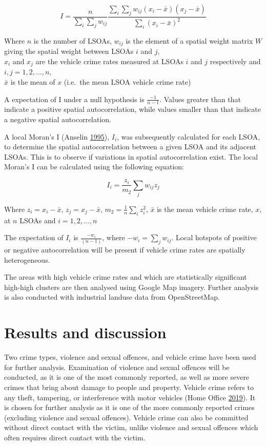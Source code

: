 \documentclass[]{article}
\begin{document}
\[I=\frac{n} {\sum_{i}\sum_{j}w_{ij}} \frac{\sum_{i}\sum_{j}w_{ij}(x_i-\bar{x})(x_j-\bar{x})} {\sum_{i}(x_i-\bar{x})^2}\]

Where \(n\) is the number of LSOAs, \(w_{ij}\) is the element of a
spatial weight matrix \(W\) giving the spatial weight between LSOAs
\(i\) and \(j\),\\
\(x_i\) and \(x_j\) are the vehicle crime rates measured at LSOAs \(i\)
and \(j\) respectively and \(i,j=1,2,...,n\),\\
\(\bar{x}\) is the mean of \(x\) (i.e.~the mean LSOA vehicle crime rate)

A expectation of I under a null hypothesis is \(\frac{-1} {n-1}\).
Values greater than that indicate a positive spatial autocorrelation,
while values smaller than that indicate a negative spatial
autocorrelation.

A local Moran's I (Anselin \protect\hyperlink{ref-Anselin1995}{1995}),
\(I_i\), was subsequently calculated for each LSOA, to determine the
spatial autocorrelation between a given LSOA and its adjacent LSOAs.
This is to observe if variations in spatial autocorrelation exist. The
local Moran's I can be calculated using the following equation:

\[I_i=\frac{z_i}{m_2}\sum_{j}w_{ij}z_j\]

Where \(z_i = x_i-\bar{x}\), \(z_j = x_j-\bar{x}\),
\(m_2=\frac{1}{n}\sum_{i}z_i^2\), \(\bar{x}\) is the mean vehicle crime
rate, \(x\), at \(n\) LSOAs and \(i=1,2,...,n\)

The expectation of \(I_i\) is \(\frac{-w_i}{(n-1)}\), where
\(-w_i=\sum_{j}w_{ij}\). Local hotspots of positive or negative
autocorrelation will be present if vehicle crime rates are spatially
heterogeneous.

The areas with high vehicle crime rates and which are statistically
significant high-high clusters are then analysed using Google Map
imagery. Further analysis is also conducted with industrial landuse data
from OpenStreetMap. \pagebreak

\section{Results and discussion}\label{results-and-discussion}

Two crime types, violence and sexual offences, and vehicle crime have
been used for further analysis. Examination of violence and sexual
offences will be conducted, as it is one of the most commonly reported,
as well as more severe crimes that bring about damage to people and
property. Vehicle crime refers to any theft, tampering, or interference
with motor vehicles (Home Office
\protect\hyperlink{ref-Office2019}{2019}). It is chosen for further
analysis as it is one of the more commonly reported crimes (excluding
violence and sexual offences). Vehicle crime can also be committed
without direct contact with the victim, unlike violence and sexual
offences which often requires direct contact with the victim.
\end{document}
